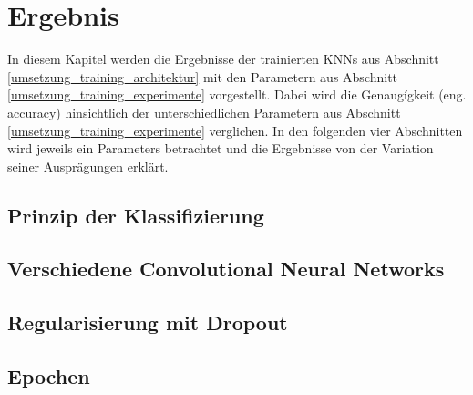 

\chapter{Ergebnis}
\label{ergebnis}

In diesem Kapitel werden die Ergebnisse der trainierten \acp{KNN} aus Abschnitt \ref{umsetzung_training_architektur} mit den Parametern aus Abschnitt \ref{umsetzung_training_experimente} vorgestellt. Dabei wird die Genaugígkeit (eng. accuracy) hinsichtlich der unterschiedlichen Parametern aus Abschnitt \ref{umsetzung_training_experimente} verglichen. In den folgenden vier Abschnitten wird jeweils ein Parameters betrachtet und die Ergebnisse von der Variation seiner Ausprägungen erklärt.


\section{Prinzip der Klassifizierung}
\label{ergebnis_prinzip}




\section{Verschiedene Convolutional Neural Networks}
\label{ergebnis_cnn}




\section{Regularisierung mit Dropout}
\label{ergebnis_dropout}




\section{Epochen}
\label{ergebnis_epochen}












